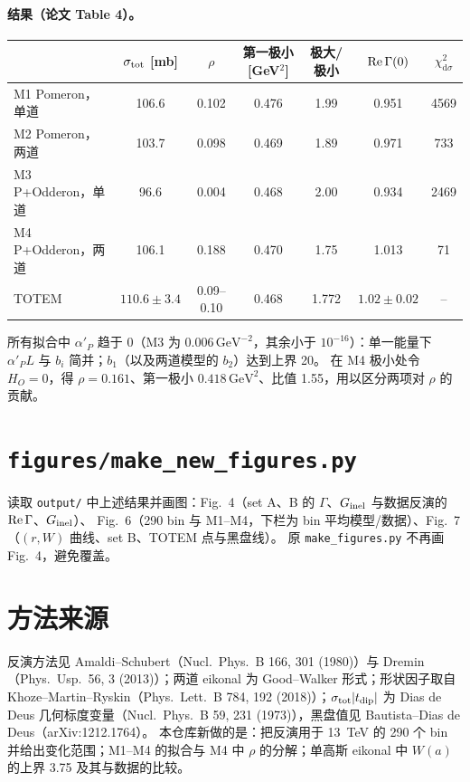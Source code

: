 \documentclass[11pt,a4paper]{ctexart}
\newcommand{\dd}{\mathrm d}
\newcommand{\GeVt}{\,\mathrm{GeV}^2}
\newcommand{\GeVm}{\,\mathrm{GeV}^{-2}}
\begin{document}
\paragraph{结果（论文 Table 4）。}
\begin{center}\small
\begin{tabular}{lcccccc}
\toprule
 & $\sigma_{\rm tot}$ [mb] & $\rho$ & 第一极小 [GeV$^2$] & 极大/极小 & ${\rm Re}\,\Gamma(0)$ & $\chi^2_{\dd\sigma}$\\
\midrule
M1 Pomeron，单道 & 106.6 & 0.102 & 0.476 & 1.99 & 0.951 & 4569\\
M2 Pomeron，两道 & 103.7 & 0.098 & 0.469 & 1.89 & 0.971 & 733\\
M3 P+Odderon，单道 & 96.6 & 0.004 & 0.468 & 2.00 & 0.934 & 2469\\
M4 P+Odderon，两道 & 106.1 & 0.188 & 0.470 & 1.75 & 1.013 & 71\\
TOTEM & $110.6\pm3.4$ & 0.09--0.10 & 0.468 & 1.772 & $1.02\pm0.02$ & --\\
\bottomrule
\end{tabular}
\end{center}
所有拟合中 $\alpha'_P$ 趋于 0（M3 为 $0.006\GeVm$，其余小于 $10^{-16}$）：单一能量下 $\alpha'_PL$ 与 $b_i$ 简并；$b_1$（以及两道模型的 $b_2$）达到上界 20。
在 M4 极小处令 $H_O=0$，得 $\rho=0.161$、第一极小 $0.418\GeVt$、比值 1.55，用以区分两项对 $\rho$ 的贡献。

\section{\texttt{figures/make\_new\_figures.py}}

读取 \texttt{output/} 中上述结果并画图：Fig.~4（set A、B 的 $\Gamma$、$G_{\rm inel}$ 与数据反演的 ${\rm Re}\,\Gamma$、$G_{\rm inel}$）、
Fig.~6（290 bin 与 M1--M4，下栏为 bin 平均模型/数据）、Fig.~7（$(r,W)$ 曲线、set B、TOTEM 点与黑盘线）。
原 \texttt{make\_figures.py} 不再画 Fig.~4，避免覆盖。

\section{方法来源}

反演方法见 Amaldi--Schubert（Nucl.\ Phys.\ B 166, 301 (1980)）与 Dremin（Phys.\ Usp.\ 56, 3 (2013)）；两道 eikonal 为
Good--Walker 形式；形状因子取自 Khoze--Martin--Ryskin（Phys.\ Lett.\ B 784, 192 (2018)）；$\sigma_{\rm tot}|t_{\rm dip}|$ 为
Dias de Deus 几何标度变量（Nucl.\ Phys.\ B 59, 231 (1973)），黑盘值见 Bautista--Dias de Deus（arXiv:1212.1764）。
本仓库新做的是：把反演用于 13~TeV 的 290 个 bin 并给出变化范围；M1--M4 的拟合与 M4 中 $\rho$ 的分解；单高斯 eikonal 中
$W(a)$ 的上界 3.75 及其与数据的比较。
\end{document}
